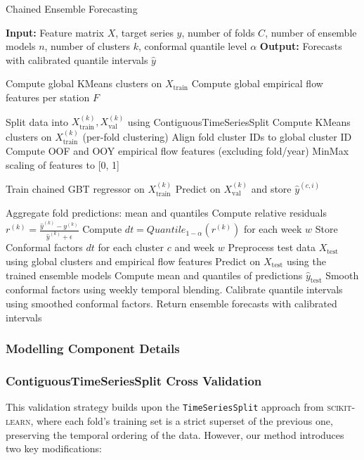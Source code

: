 \documentclass[ruler]{CUP-JNL-EDS}%
\begin{document}
\begin{algorithm}[H]
\caption{Chained Ensemble Forecasting}
\begin{algorithmic}[1]
\State \textbf{Input:} Feature matrix $X$, target series $y$, number of folds $C$, number of ensemble models $n$, number of clusters $k$, conformal quantile level $\alpha$
\State \textbf{Output:} Forecasts with calibrated quantile intervals $\hat{y}$

\State Compute global KMeans clusters on $X_{\text{train}}$
\State Compute global empirical flow features per station $F$

    \State Split data into $X^{(k)}_{\text{train}}, X^{(k)}_{\text{val}}$ using ContiguousTimeSeriesSplit
    \State Compute KMeans clusters on $X^{(k)}_{\text{train}}$ (per-fold clustering)
    \State Align fold cluster IDs to global cluster ID
    \State Compute OOF and OOY empirical flow features (excluding fold/year)
    \State MinMax scaling of features to [0, 1]
    
        \State Train chained GBT regressor on $X^{(k)}_{\text{train}}$
        \State Predict on $X^{(k)}_{\text{val}}$ and store $\hat{y}^{(c,i)}$
    \EndFor
    
    \State Aggregate fold predictions: mean and quantiles
    \State Compute relative residuals $r^{(k)} = \frac{\hat{y}^{(k)} - y^{(k)}}{\hat{y}^{(k)} + \epsilon}$
    \State Compute $d{t} = Quantile_{1-\alpha}(r^{(k)})$ for each week $w$
    \State Store Conformal factors $d{t}$ for each cluster $c$ and week $w$
\EndFor
\State Preprocess test data $X_{\text{test}}$ using global clusters and empirical flow features
\State Predict on $X_{\text{test}}$ using the trained ensemble models
\State Compute mean and quantiles of predictions $\hat{y}_{\text{test}}$
\State Smooth conformal factors using weekly temporal blending.
\State Calibrate quantile intervals using smoothed conformal factors.
\State Return ensemble forecasts with calibrated intervals
\end{algorithmic}
\end{algorithm}

\subsubsection{Modelling Component Details}
\subsubsection*{ContiguousTimeSeriesSplit Cross Validation}
This validation strategy builds upon the \texttt{TimeSeriesSplit} approach from \textsc{scikit-learn}, where each fold's training set is a strict superset of the previous one, preserving the temporal ordering of the data. However, our method introduces two key modifications:
\end{document}
